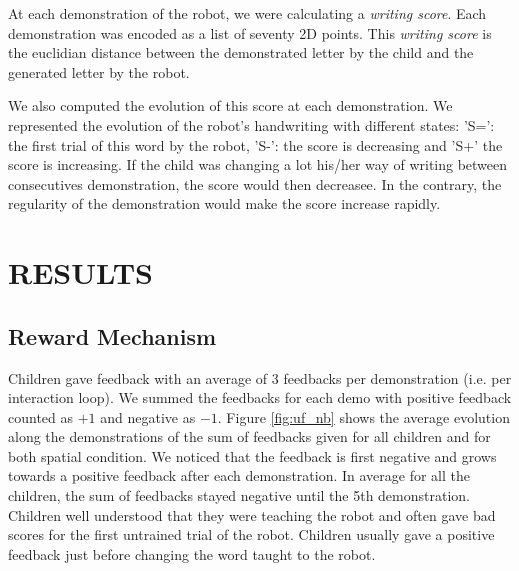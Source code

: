 \documentclass[letterpaper, 10 pt, conference]{ieeeconf}  %
\begin{document}
At each demonstration of the robot, we were calculating a \emph{writing score}. 
Each demonstration was encoded as a list of seventy 2D points.
This \emph{writing score} is the euclidian distance between the demonstrated letter by the child and the generated letter by the robot.

We also computed the evolution of this score at each demonstration.
We represented the evolution of the robot's handwriting with different states:
'S=': the first trial of this word by the robot, 'S-': the score is decreasing and 'S+' the score is increasing. 
If the child was changing a lot his/her way of writing between consecutives demonstration, the score would then decreasee.
In the contrary, the regularity of the demonstration would make the score increase rapidly.


\section{RESULTS}

\subsection{Reward Mechanism}
\vspace{-0.2cm}
Children gave feedback with an average of 3 feedbacks per demonstration (i.e. per interaction loop).
We summed the feedbacks for each demo with positive feedback counted as $+1$ and negative as $-1$.
Figure \ref{fig:uf_nb} shows the average evolution along the demonstrations of the sum of feedbacks given for all children and for both spatial condition.
We noticed that the feedback is first negative and grows towards a positive feedback after each demonstration.
In average for all the children, the sum of feedbacks stayed negative until the 5th demonstration.
Children well understood that they were teaching the robot and often gave bad scores for the first untrained trial of the robot.
Children usually gave a positive feedback just before changing the word taught to the robot.
\end{document}
